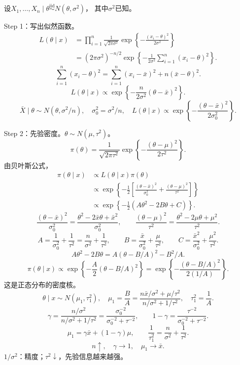 设$X_1,\ldots,X_n\mid\theta\overset{\mathrm{iid}}{\sim}N(\theta,\sigma^2)$，
其中$\sigma^2$已知。

Step 1：写出似然函数。
\begin{align*}
L(\theta\mid x)
&=\prod_{i=1}^n\frac1{\sqrt{2\pi\sigma^2}}
\exp\left\{-\frac{(x_i-\theta)^2}{2\sigma^2}\right\}\\
&=(2\pi\sigma^2)^{-n/2}
\exp\left\{-\frac1{2\sigma^2}\sum_{i=1}^n(x_i-\theta)^2\right\}.
\end{align*}
\[
\sum_{i=1}^n(x_i-\theta)^2
=\sum_{i=1}^n(x_i-\bar x)^2+n(\bar x-\theta)^2.
\]
\[
L(\theta\mid x)\propto
\exp\left\{-\frac{n}{2\sigma^2}(\theta-\bar x)^2\right\}.
\]
\[
\bar X\mid\theta\sim N(\theta,\sigma^2/n),\quad
\sigma_0^2=\sigma^2/n,\quad
L(\theta\mid x)\propto\exp\left\{-\frac{(\theta-\bar x)^2}{2\sigma_0^2}\right\}.
\]

Step 2：先验密度。$\theta\sim N(\mu,\tau^2)$。
\[
\pi(\theta)=\frac1{\sqrt{2\pi\tau^2}}
\exp\left\{-\frac{(\theta-\mu)^2}{2\tau^2}\right\}.
\]
由贝叶斯公式，
\begin{align*}
\pi(\theta\mid x)
&\propto L(\theta\mid x)\pi(\theta)\\
&\propto\exp\left\{-\frac12
\left[\frac{(\theta-\bar x)^2}{\sigma_0^2}
+\frac{(\theta-\mu)^2}{\tau^2}\right]\right\}\\
&\propto\exp\left\{-\frac12(A\theta^2-2B\theta+C)\right\}.
\end{align*}
\[
\frac{(\theta-\bar x)^2}{\sigma_0^2}
=\frac{\theta^2-2\bar x\theta+\bar x^2}{\sigma_0^2},
\qquad
\frac{(\theta-\mu)^2}{\tau^2}
=\frac{\theta^2-2\mu\theta+\mu^2}{\tau^2}.
\]
\[
A=\frac1{\sigma_0^2}+\frac1{\tau^2}
=\frac n{\sigma^2}+\frac1{\tau^2},\qquad
B=\frac{\bar x}{\sigma_0^2}+\frac\mu{\tau^2},\qquad
C=\frac{\bar x^2}{\sigma_0^2}+\frac{\mu^2}{\tau^2}.
\]
\[
A\theta^2-2B\theta=A(\theta-B/A)^2-B^2/A.
\]
\[
\pi(\theta\mid x)\propto
\exp\left\{-\frac A2(\theta-B/A)^2\right\}
=\exp\left\{-\frac{(\theta-B/A)^2}{2(1/A)}\right\}.
\]
这是正态分布的密度核。
\[
\theta\mid x\sim N(\mu_1,\tau_1^2),\quad
\mu_1=\frac BA=\frac{n\bar x/\sigma^2+\mu/\tau^2}{n/\sigma^2+1/\tau^2},
\quad\tau_1^2=\frac1A.
\]
\[
\gamma=\frac{n/\sigma^2}{n/\sigma^2+1/\tau^2}
=\frac{\sigma_0^{-2}}{\sigma_0^{-2}+\tau^{-2}},
\qquad
1-\gamma=\frac{\tau^{-2}}{\sigma_0^{-2}+\tau^{-2}}.
\]
\[
\boxed{\mu_1=\gamma\bar x+(1-\gamma)\mu},\qquad
\boxed{\frac1{\tau_1^2}=\frac n{\sigma^2}+\frac1{\tau^2}}.
\]
\[
n\uparrow,\quad\gamma\to1,\quad\mu_1\to\bar x.
\]
$1/\sigma^2$：精度；$\tau^2\downarrow$，先验信息越来越强。

